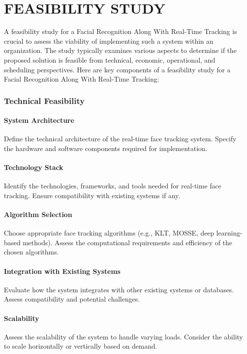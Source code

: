       \chapter{FEASIBILITY STUDY}
A feasibility study for a Facial Recognition Along With Real-Time Tracking is crucial to assess the viability of implementing such a system within an organization. The study typically examines various aspects to determine if the proposed solution is feasible from technical, economic, operational, and scheduling perspectives. Here are key components of a feasibility study for a Facial Recognition Along With Real-Time Tracking:

\subsection{Technical Feasibility}
\subsubsection{System Architecture}
Define the technical architecture of the real-time face tracking system.
Specify the hardware and software components required for implementation.
\subsubsection{Technology Stack}
Identify the technologies, frameworks, and tools needed for real-time face tracking.
Ensure compatibility with existing systems if any.
\subsubsection{Algorithm Selection}
Choose appropriate face tracking algorithms (e.g., KLT, MOSSE, deep learning-based methods).
Assess the computational requirements and efficiency of the chosen algorithms.
\subsubsection{Integration with Existing Systems}
Evaluate how the system integrates with other existing systems or databases.
Assess compatibility and potential challenges.

\subsubsection{Scalability}
Assess the scalability of the system to handle varying loads.
Consider the ability to scale horizontally or vertically based on demand.

